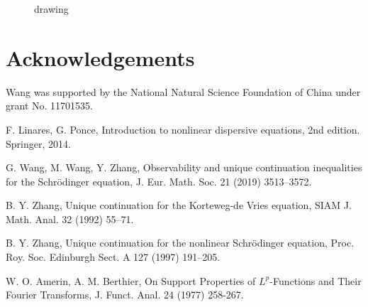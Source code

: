 \documentclass[12pt]{amsart}
\theoremstyle{definition}
\numberwithin{equation}{section}
\begin{document}
\begin{figure}[ht]
    \centering
    \caption{drawing}
    \label{fig:drawing}
\end{figure}
\section*{Acknowledgements}



 Wang was supported by the National Natural Science Foundation of China under grant No. 11701535.
\begin{thebibliography}{999}

{\scriptsize


 

 F. Linares, G. Ponce, Introduction to nonlinear dispersive equations, 2nd edition. Springer, 2014.


   G. Wang, M. Wang, Y. Zhang, Observability and unique continuation inequalities for the Schr\"{o}dinger equation, J. Eur. Math. Soc.  21 (2019) 3513--3572.

 B. Y. Zhang,   Unique continuation for the Korteweg-de Vries equation, SIAM J. Math. Anal. 32 (1992)  55--71.

   B. Y. Zhang,   Unique continuation for the nonlinear Schr\"odinger equation, Proc. Roy. Soc. Edinburgh Sect. A 127 (1997)  191--205.

   W. O. Amerin, A. M. Berthier, On Support Properties of $L^p$-Functions and Their Fourier Transforms, J. Funct. Anal. 24 (1977) 258-267.
  }
\end{thebibliography}
\end{document}
